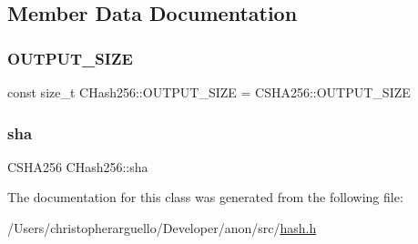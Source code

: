 \subsection{Member Data Documentation}
\mbox{\label{class_c_hash256_a6812a40441acb1c3b7f10c7e38c7d467}} 
\subsubsection{\texorpdfstring{O\+U\+T\+P\+U\+T\+\_\+\+S\+I\+ZE}{OUTPUT\_SIZE}}
{\footnotesize\ttfamily const size\+\_\+t C\+Hash256\+::\+O\+U\+T\+P\+U\+T\+\_\+\+S\+I\+ZE = C\+S\+H\+A256\+::\+O\+U\+T\+P\+U\+T\+\_\+\+S\+I\+ZE\hspace{0.3cm}{\ttfamily [static]}}

\mbox{\label{class_c_hash256_af06b992e00e1bd7290388aed522a535f}} 
\subsubsection{\texorpdfstring{sha}{sha}}
{\footnotesize\ttfamily C\+S\+H\+A256 C\+Hash256\+::sha\hspace{0.3cm}{\ttfamily [private]}}



The documentation for this class was generated from the following file\+:\begin{DoxyCompactItemize}
\item 
/\+Users/christopherarguello/\+Developer/anon/src/\mbox{\hyperlink{hash_8h}{hash.\+h}}\end{DoxyCompactItemize}
